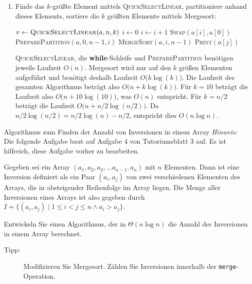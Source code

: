 \documentclass[11pt,a4paper]{article}
\begin{document}
\begin{loesung}
\begin{enumerate}
        \item Finde das $k$-größte Element mittels \textsc{QuickSelectLinear}, partitioniere anhand dieses Elements, sortiere die $k$ größten Elemente mittels Mergesort:
        \begin{algorithmic}[1]
                \State $v \gets \text{\textsc{QuickSelectLinear}$(a, n, k)$}$
                \State $i \gets 0$
                    \State $i \gets i + 1$
                \EndWhile
                \State \textsc{Swap}$(a[i], a[0])$
                \State \textsc{PreparePartition}$(a, 0, n - 1, i)$
                \State \textsc{MergeSort}$(a, i, n - 1)$
                    \State \textsc{Print}$(a[j])$
                \EndFor
            \EndProcedure
        \end{algorithmic}
        \textsc{QuickSelectLinear}, die \textbf{while}-Schleife und \textsc{PreparePartition} benötigen jeweils Laufzeit $O(n)$.
        Merge\-sort wird nur auf den $k$ größen Elementen aufgeführt und benötigt deshalb Laufzeit $O\big(k \log(k)\big)$. 
        Die Laufzeit des gesamten Algorithmus beträgt also $O\big(n + k\log(k)\big)$.
        Für $k = 10$ beträgt die Laufzeit also $O\big(n + 10\log(10)\big)$, was $O(n)$ entspricht.
        Für $k = n / 2$ beträgt die Laufzeit $O\big(n + n / 2 \log(n / 2))$.
        Da $n / 2 \log(n / 2) = n / 2 \log(n) - n / 2$, entspricht dies $O(n \log n)$.
    \end{enumerate}
\end{loesung}

\begin{aufgabe}{4}{\hard Algorithmus zum Finden der Anzahl von Inversionen in einem Array}
    \textit{Hinweis:} Die folgende Aufgabe baut auf Aufgabe 4 von Tutoriumsblatt 3 auf.
    Es ist hilfreich, diese Aufgabe vorher zu bearbeiten.

    Gegeben sei ein Array $(a_1, a_2, a_3, \ldots a_{n - 1}, a_n)$ mit $n$ Elementen.
    Dann ist eine Inversion definiert als ein Paar $(a_i, a_j)$ von zwei verschiedenen Elementen des Arrays, die in absteigender Reihenfolge im Array liegen.
    Die Menge aller Inversionen eines Arrays ist also gegeben durch $I = \{(a_i, a_j) \mid 1 \leq i < j \leq n \wedge a_i > a_j \}$.

    Entwickeln Sie einen Algorithmus, der in $\Theta(n \log n)$ die Anzahl der Inversionen in einem Array berechnet.
    \begin{description}
        \item[Tipp:] Modifizieren Sie Mergesort. Zählen Sie Inversionen innerhalb der \texttt{merge}-Operation.
    \end{description}
\end{aufgabe}
\end{document}
